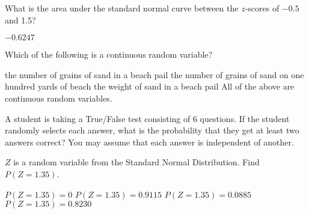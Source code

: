 \documentclass[noanswers]{exam}
\begin{document}
\begin{questions}
\vspace{3mm}

\question What is the area under the standard normal curve between the $z$-scores of $-0.5$ and 1.5?

\vspace{3mm}

\begin{choices}
	\choice $-0.6247$
\end{choices}

\vspace{3mm}

\question Which of the following is a continuous random variable?

\vspace{3mm}

\begin{choices}
	\choice the number of grains of sand in a beach pail
	\choice the number of grains of sand on one hundred yards of beach
	\CorrectChoice the weight of sand in a beach pail
	\choice All of the above are continuous random variables.
\end{choices}

\vspace{3mm} 

\question A student is taking a True/False test consisting of 6 questions. If the student randomly selects each answer, what is the probability that they get at least two answers correct? You may assume that each answer is independent of another.

\vspace{3mm}

\begin{choices}
\end{choices}

\vspace{3mm}

\newpage
\question $Z$ is a random variable from the Standard Normal Distribution. Find $P(Z=1.35)$.

\vspace{3mm}

\begin{choices}
	\CorrectChoice $P(Z=1.35)=0$
	\choice $P(Z=1.35)=0.9115$
	\choice $P(Z=1.35)=0.0885$
	\choice $P(Z=1.35)=0.8230$
\end{choices}

\vspace{3mm}


\end{questions}
\end{document}

